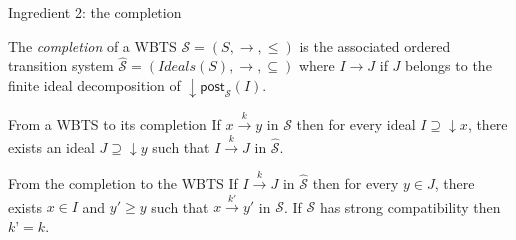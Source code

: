 \documentclass{beamer}
\newcommand{\post}{\textsf{post}}
\begin{document}
  \begin{frame}{Ingredient 2: the completion}
 
 
 \begin{definition}
The \emph{completion}   of a WBTS $\mathscr{S}=(S,\rightarrow, \leq)$ is the associated ordered transition system $\hat{\mathscr{S}}=(Ideals(S),\rightarrow, \subseteq)$ where 
 $I \rightarrow J$ if $J$ belongs to the finite ideal decomposition of $\mathop{\downarrow} \post_{\mathscr{S}}(I)$. 
\end{definition}



\pause

\begin{exampleblock}{From a WBTS to its completion}
If $x \xrightarrow{k} y$ in $\mathscr{S}$ then for every ideal $I \supseteq \mathop{\downarrow} x$, there exists an ideal $J \supseteq \mathop{\downarrow} y$ such that $I \xrightarrow{k} J$ in $\hat{\mathscr{S}}$.
\end{exampleblock}


\pause

\begin{exampleblock}{From the completion to the WBTS}
If $I \xrightarrow{k} J$ in $\hat{\mathscr{S}}$ then for every $y \in J$, there exists $x \in I$ and $y' \geq y$ such that $x \xrightarrow{k'} y'$ in $\mathscr{S}$. If $\mathscr{S}$ has strong compatibility then $k’ = k$.
\end{exampleblock}



 
  

  \end{frame}
\end{document}
